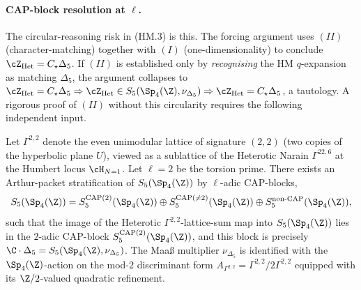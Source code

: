 \paragraph{CAP-block resolution at $\ell$.}

The circular-reasoning risk in (HM.3) is this. The forcing argument
uses $(II)$ (character-matching) together with $(I)$
(one-dimensionality) to conclude $\cZ_{\mathrm{Het}} = C_\star
\Delta_5$. If $(II)$ is established only by \emph{recognising}
the HM $q$-expansion as matching $\Delta_5$, the argument
collapses to $\cZ_{\mathrm{Het}} = C_\star \Delta_5 \Rightarrow
\cZ_{\mathrm{Het}} \in S_5(\Sp_4(\Z), \nu_{\Delta_5}) \Rightarrow
\cZ_{\mathrm{Het}} = C_\star \Delta_5$, a tautology. A rigorous
proof of $(II)$ without this circularity requires the following
independent input.

\begin{conjecture}[CAP-block resolution at $\ell = 2$ for the
Heterotic $\Gamma^{2,2}$-multiplier]
\label{conj:cap-block-resolution-heterotic-gamma22-multiplier}
Let $\Gamma^{2,2}$ denote the even unimodular lattice of signature
$(2,2)$ (two copies of the hyperbolic plane $U$), viewed as a
sublattice of the Heterotic Narain $\Gamma^{22,6}$ at the Humbert
locus $\cH_{N=1}$. Let $\ell = 2$ be the torsion prime. There
exists an Arthur-packet stratification of $S_5(\Sp_4(\Z))$ by
$\ell$-adic CAP-blocks,
\[
S_5(\Sp_4(\Z)) = S_5^{\mathrm{CAP}(2)}(\Sp_4(\Z)) \oplus
S_5^{\mathrm{CAP}(\neq 2)}(\Sp_4(\Z))
\oplus S_5^{\mathrm{non\text{-}CAP}}(\Sp_4(\Z)),
\]
such that the image of the Heterotic $\Gamma^{2,2}$-lattice-sum
map into $S_5(\Sp_4(\Z))$ lies in the $2$-adic CAP-block
$S_5^{\mathrm{CAP}(2)}(\Sp_4(\Z))$, and this block is precisely
$\C \cdot \Delta_5 = S_5(\Sp_4(\Z), \nu_{\Delta_5})$. The Maa{\ss}
multiplier $\nu_{\Delta_5}$ is identified with the
$\Sp_4(\Z)$-action on the mod-$2$ discriminant form
$A_{\Gamma^{2,2}} = \Gamma^{2,2}/2\Gamma^{2,2}$ equipped with its
$\Z/2$-valued quadratic refinement.
\end{conjecture}

